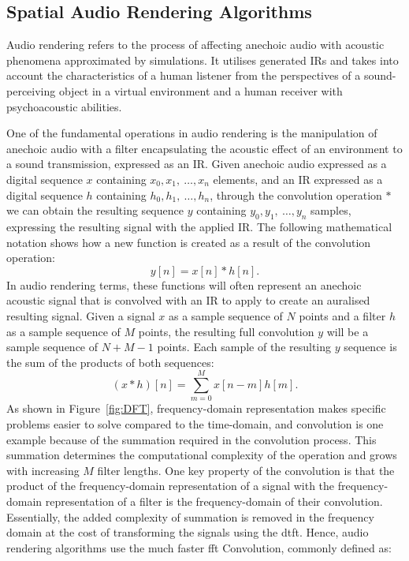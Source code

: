 \subsection{Spatial Audio Rendering Algorithms}
\label{sec:real-time-conv}
Audio rendering refers to the process of affecting anechoic audio with acoustic phenomena approximated by simulations. It utilises generated IRs and takes into account the characteristics of a human listener from the perspectives of a sound-perceiving object in a virtual environment and a human receiver with psychoacoustic abilities.\par
One of the fundamental operations in audio rendering is the manipulation of anechoic audio with a filter encapsulating the acoustic effect of an environment to a sound transmission, expressed as an IR. Given anechoic audio expressed as a digital sequence $x$ containing $x_0, x_1,~\dots,x_n$ elements, and an IR expressed as a digital sequence $h$ containing $h_0, h_1,~\dots,h_n$, through the convolution operation $*$ we can obtain the resulting sequence $y$ containing $y_0, y_1,~\dots, y_n$ samples, expressing the resulting signal with the applied IR. The following mathematical notation shows how a new function is created as a result of the convolution operation:
\begin{equation}
    y[n] = x[n] * h[n].
\label{eq:1d-convolution}
\end{equation}
In audio rendering terms, these functions will often represent an anechoic acoustic signal that is convolved with an IR to apply to create an auralised resulting signal. Given a signal $x$ as a sample sequence of $N$ points and a filter $h$ as a sample sequence of $M$ points, the resulting full convolution $y$ will be a sample sequence of $N + M - 1$ points. Each sample of the resulting $y$ sequence is the sum of the products of both sequences: 
\begin{equation}
    (x * h)[n] = \sum_{m=0}^{M}x[n-m]h[m].
\end{equation}
As shown in Figure~\ref{fig:DFT}, frequency-domain representation makes specific problems easier to solve compared to the time-domain, and convolution is one example because of the summation required in the convolution process. This summation determines the computational complexity of the operation and grows with increasing $M$ filter lengths. One key property of the convolution is that the product of the frequency-domain representation of a signal with the frequency-domain representation of a filter is the frequency-domain of their convolution. Essentially, the added complexity of summation is removed in the frequency domain at the cost of transforming the signals using the \acrshort{dtft}. Hence, audio rendering algorithms use the much faster \acrfull{fft} Convolution, commonly defined as:
